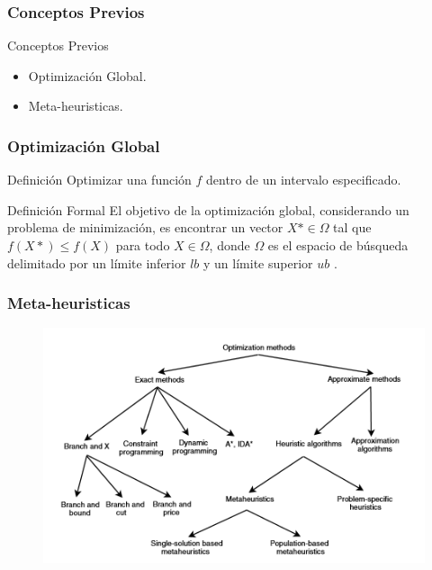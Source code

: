 \begin{frame}

\frametitle{Conceptos Previos}

\begin{block}{Conceptos Previos}
\begin{itemize}
	\item Optimización Global.
	\item Meta-heuristicas.
\end{itemize}
\end{block}
\end{frame}

\begin{frame}

\frametitle{Optimización Global}

\begin{block}{Definición}
Optimizar una función $f$ dentro de un intervalo especificado.
\end{block}

\begin{block}{Definición Formal}
El objetivo de la optimización global, considerando un problema de minimización, es encontrar un vector $X* \in \Omega$ tal que $f(X*) \leq f(X)$ para todo $X \in \Omega$, donde $\Omega$ es el espacio de búsqueda delimitado por un límite inferior $lb$ y un límite superior $ub$ \cite{Segredo}.
\end{block}
\end{frame}



\begin{frame}
\frametitle{Meta-heuristicas}
\begin{figure}
  \centering
	\includegraphics[scale=0.9]{img/meta}\\[10mm]
\end{figure}
\end{frame}

